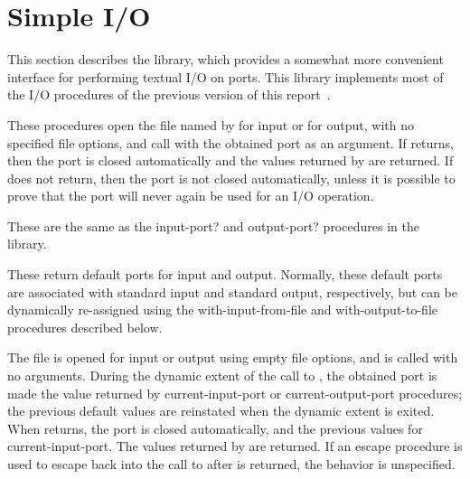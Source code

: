 \section{Simple I/O}
\label{simpleiosection}

This section describes the  library, which
provides a somewhat more convenient interface for performing textual
I/O on ports.  This library implements most of the 
I/O procedures of the previous version of this report~\cite{R5RS}.

\begin{entry}{%
}

These procedures open the file named by  for input or
for output, with no specified file options, and call  with
the obtained port as an argument.  If  returns, then the
port is closed automatically and the values returned by  are
returned. If  does not return, then the port is not
closed automatically, unless it is possible to prove that the port
will never again be used for an I/O operation.
\end{entry}

\begin{entry}{%
}

These are the same as the {\cf input-port?} and {\cf output-port?}
procedures in the  library.
\end{entry}

\begin{entry}{%
}

These return default ports for input and output.  Normally, these
default ports are associated with standard input and standard output,
respectively, but can be dynamically re-assigned using the {\cf
  with-input-from-file} and {\cf with-output-to-file} procedures
described below.
\end{entry}

\begin{entry}{%
}

  The
file is opened for input or output using empty file options, and
 is called with no arguments.  During the dynamic extent of
the call to , the obtained port is made the value returned
by {\cf current-input-port} or {\cf current-output-port} procedures;
the previous default values are reinstated when the dynamic extent is
exited.  When  returns, the port is closed automatically,
and the previous values for {\cf current-input-port}.  The values
returned by  are returned.  If an escape procedure is used
to escape back into the call to  after  is
returned, the behavior is unspecified.
\end{entry}

